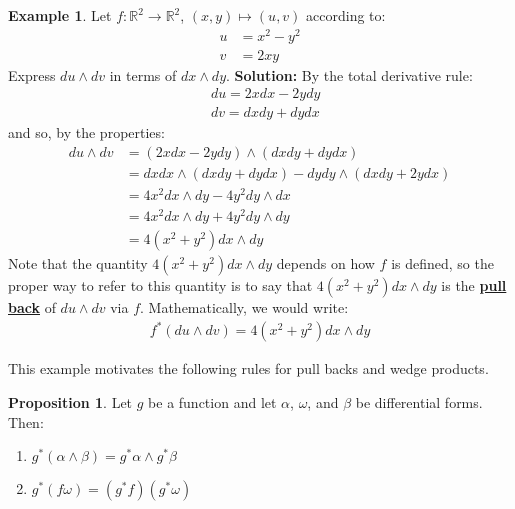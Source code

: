 \documentclass[11pt]{scrartcl}
\newcommand{\R}[0]{\mathbb{R}}
\theoremstyle{definition}
\newtheorem{prop}{Proposition}
\newtheorem{ex}{Example}
\theoremstyle{remark}
\newcommand{\dfn}[1]{\textbf{\underline{#1}}}
\begin{document}
{\begin{ex}
	Let $f: \R^2 \rightarrow \R^2$, $(x,y) \mapsto (u,v)$ according to: 
	\begin{align*}
		 u & = x^2 - y^2 \\
		v & = 2xy 
	\end{align*}
	Express $du \wedge dv$ in terms of $dx \wedge dy$. 
	\newline
	\textbf{Solution:} By the total derivative rule: 
	\begin{align*}
		& du = 2x dx - 2y dy \\
		& dv = dx dy + dy dx 
	\end{align*}
	and so, by the properties: 
	\begin{align*}
		du \wedge dv & = (2x dx - 2ydy ) \wedge (dx dy + dy dx) \\
					 & = dx dx \wedge (dx dy + dy dx) - dy dy \wedge (dx dy + 2ydx) \\
					 & = 4x^2 dx \wedge dy - 4y^2 dy \wedge dx \\
					 & = 4x^2 dx \wedge dy + 4y^2 dy \wedge dy \\
					 & = 4(x^2 + y^2) dx \wedge dy 
	\end{align*}
	Note that the quantity $ 4(x^2 + y^2) dx \wedge dy $ depends on how $f$ is defined, so the proper way to refer to this quantity is to say that $ 4(x^2 + y^2) dx \wedge dy $ is the \dfn{pull back} of $du \wedge dv$ via $f$. Mathematically, we would write: 
	\begin{align*}
		f^*(du \wedge dv) = 4(x^2 + y^2) dx \wedge dy 
	\end{align*}
\end{ex}

This example motivates the following rules for pull backs and wedge products. 

\begin{prop}
	Let $g$ be a function and let $\alpha$, $\omega$, and $\beta$ be differential forms. Then: 
	\begin{enumerate}[noitemsep]
		\item $g^*(\alpha \wedge \beta) = g^* \alpha \wedge g^* \beta$ 
		\item $g^*(f \omega) = (g^* f) (g^* \omega) $
	\end{enumerate}
\end{prop}



}
\end{document}
